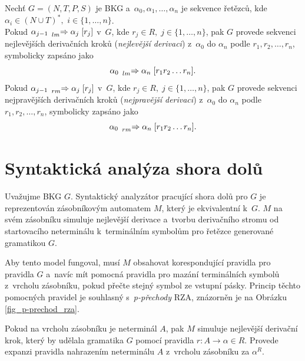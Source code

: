 \begin{definition}\label{def_sekvence_nejl_nejpr_der}
    Nechť $G = (N, T, P, S)$ je BKG a~$\alpha_0, \alpha_1, \ldots, \alpha_n$ je sekvence řetězců, kde $\alpha_i \in (N \cup T)^*,$ $i \in \{1, \ldots, n\}$.\\
    Pokud $\alpha_{j-1}\; \prescript{}{\scriptstyle lm}{\Rightarrow}\; \alpha_j\; [r_j]$ v~$G$, kde $r_j \in R,\; j \in \{1, \ldots, n\}$, pak $G$ provede sekvenci nejlevějších derivačních kroků (\emph{nejlevější derivaci}) z~$\alpha_0$ do $\alpha_n$ podle $r_1, r_2, \ldots, r_n$, symbolicky zapsáno jako
    \begin{equation*}
        \alpha_0\; \prescript{}{\scriptstyle lm}{\Rightarrow}\; \alpha_n\; [r_1r_2\ldots r_n].
    \end{equation*} 
    Pokud $\alpha_{j-1}\; \prescript{}{\scriptstyle rm}{\Rightarrow}\; \alpha_j\; [r_j]$ v~$G$, kde $r_j \in R,\; j \in \{1, \ldots, n\}$, pak $G$ provede sekvenci nejpravějších derivačních kroků (\emph{nejpravější derivaci}) z~$\alpha_0$ do $\alpha_n$ podle $r_1, r_2, \ldots, r_n$, symbolicky zapsáno jako
    \begin{equation*}
        \alpha_0\; \prescript{}{\scriptstyle rm}{\Rightarrow}\; \alpha_n\; [r_1r_2\ldots r_n].
    \end{equation*}
\end{definition}

\section{Syntaktická analýza shora dolů}\label{kap_sa_shora_dolu}
Uvažujme BKG $G$.
Syntaktický analyzátor pracující shora dolů pro $G$ je reprezentován zásobníkovým automatem $M$, který je ekvivalentní k~$G$.
$M$ na svém zásobníku simuluje nejlevější derivace a~tvorbu derivačního stromu od startovacího neterminálu k~terminálním symbolům pro řetězce generované gramatikou $G$.

Aby tento model fungoval, musí $M$ obsahovat korespondující pravidla pro pravidla $G$ a~navíc mít pomocná pravidla pro mazání terminálních symbolů z~vrcholu zásobníku, pokud přečte stejný symbol ze vstupní pásky.
Princip těchto pomocných pravidel je souhlasný s~\emph{p-přechody} RZA, znázorněn je na Obrázku \ref{fig_p-prechod_rza}.

Pokud na vrcholu zásobníku je neterminál $A$, pak $M$ simuluje nejlevější derivační krok, který by udělala gramatika $G$ pomocí pravidla $r: A \rightarrow \alpha \in R$.
Provede expanzi pravidla nahrazením neterminálu $A$ z~vrcholu zásobníku za $\alpha^R$. 

